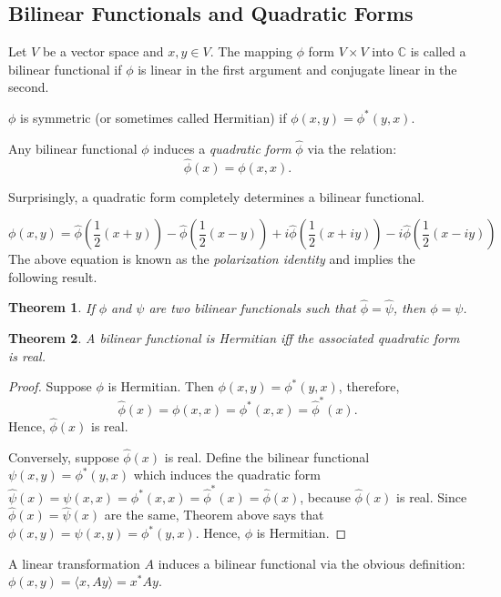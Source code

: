 \documentclass{amsart}
\newtheorem{theorem}{Theorem}
\theoremstyle{plain}
\numberwithin{equation}{section}
\begin{document}
\subsection*{Bilinear Functionals and Quadratic Forms}
Let $V$ be a vector space and $x, y \in V$. The mapping $\phi$
form $V \times V$ into $\mathbb{C}$ is called a bilinear functional if $\phi$ is  
linear in the first argument and conjugate linear in the second. 

$\phi$ is symmetric (or sometimes called Hermitian)
if $\phi(x, y) = \phi^*(y, x)$.

Any bilinear functional $\phi$ induces a \emph{quadratic form} $\hat{\phi}$ via 
the relation:
$$\hat{\phi}(x) = \phi(x, x).$$

Surprisingly, a quadratic form completely determines a bilinear functional.

\begin{equation*}
	\phi(x, y) = \hat{\phi}\left(\frac{1}{2}(x + y)\right) - \hat{\phi}\left(\frac{1}{2}(x - y)\right)
	            +i\hat{\phi}\left(\frac{1}{2}(x + iy)\right) - i\hat{\phi}\left(\frac{1}{2}(x - iy)\right)
\end{equation*}
The above equation is known as the 
\emph{polarization identity} and 
implies the following result.
\begin{theorem}
	If $\phi$ and $\psi$ are two bilinear functionals such that 
	$\hat{\phi} = \hat{\psi}$, then $\phi = \psi$.
\end{theorem}

\begin{theorem}
	A bilinear functional is Hermitian iff the associated quadratic form is real. 
\end{theorem}
\begin{proof}
	Suppose $\phi$ is Hermitian. Then $\phi(x, y) = \phi^*(y, x)$, therefore, 
	$$\hat{\phi}(x) = \phi(x, x) = \phi^*(x, x) = \hat{\phi}^*(x).$$
	Hence, $\hat{\phi}(x)$ is real.

	Conversely, suppose $\hat{\phi}(x)$ is real.
	Define the bilinear functional $\psi(x, y) = \phi^*(y, x)$ which induces the quadratic 
	form $\hat{\psi}(x) = \psi(x, x) = \phi^*(x, x) = \hat{\phi}^*(x) = \hat{\phi}(x)$, 
	because $\hat{\phi}(x)$ is real. Since $\hat{\phi}(x) = \hat{\psi}(x)$ are the 
	same, Theorem above says that $\phi(x, y) = \psi(x, y) = \phi^*(y, x)$.
	Hence, $\phi$ is Hermitian.
\end{proof}

A linear transformation $A$ induces a bilinear functional via the obvious 
definition: $\phi(x, y) = \langle x, Ay \rangle = x^*Ay$.
\end{document}
